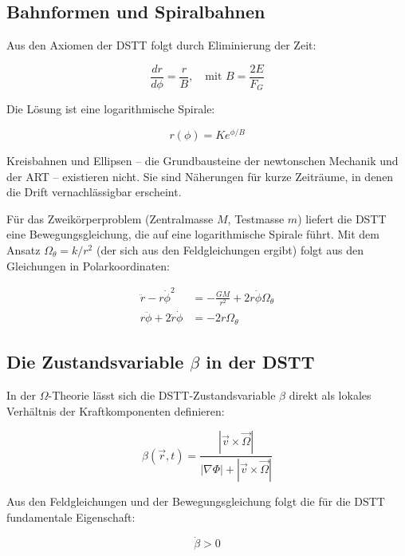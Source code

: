 \documentclass[12pt,a4paper]{article}
\begin{document}
\subsection{Bahnformen und Spiralbahnen}

Aus den Axiomen der DSTT folgt durch Eliminierung der Zeit:

\begin{equation}
\frac{dr}{d\phi} = \frac{r}{B}, \quad \text{mit } B = \frac{2E}{F_G}
\end{equation}

Die Lösung ist eine logarithmische Spirale:

\begin{equation}
r(\phi) = Ke^{\phi/B}
\end{equation}

Kreisbahnen und Ellipsen -- die Grundbausteine der newtonschen Mechanik und der ART -- existieren nicht. Sie sind Näherungen für kurze Zeiträume, in denen die Drift vernachlässigbar erscheint.

Für das Zweikörperproblem (Zentralmasse $M$, Testmasse $m$) liefert die DSTT eine Bewegungsgleichung, die auf eine logarithmische Spirale führt. Mit dem Ansatz $\Omega_\theta = k/r^2$ (der sich aus den Feldgleichungen ergibt) folgt aus den Gleichungen in Polarkoordinaten:

\begin{align}
\ddot{r} - r\dot{\phi}^2 &= -\frac{GM}{r^2} + 2r\dot{\phi}\Omega_\theta \\
r\ddot{\phi} + 2\dot{r}\dot{\phi} &= -2r\Omega_\theta
\end{align}

\subsection{Die Zustandsvariable $\beta$ in der DSTT}

In der $\Omega$-Theorie lässt sich die DSTT-Zustandsvariable $\beta$ direkt als lokales Verhältnis der Kraftkomponenten definieren:

\begin{equation}
\beta(\vec{r}, t) = \frac{|\vec{v} \times \vec{\Omega}|}{|\nabla \Phi| + |\vec{v} \times \vec{\Omega}|}
\end{equation}

Aus den Feldgleichungen und der Bewegungsgleichung folgt die für die DSTT fundamentale Eigenschaft:

\begin{equation}
\dot{\beta} > 0
\end{equation}
\end{document}

